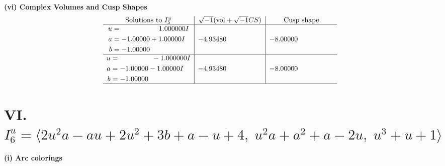 \documentclass[1p]{elsarticle_modified}
\theoremstyle{definition}
\newcommand{\I}{\sqrt{-1}}
\begin{document}
\newpage\flushleft \textbf{(vi) Complex Volumes and Cusp Shapes}
$$\begin{array}{c|c|c}  
\text{Solutions to }I^u_{5}& \I (\text{vol} + \sqrt{-1}CS) & \text{Cusp shape}\\
 \hline 
\begin{aligned}
u &= \phantom{-0.000000 -}1.000000 I \\
a &= -1.00000 + 1.00000 I \\
b &= -1.00000\phantom{ +0.000000I}\end{aligned}
 & -4.93480\phantom{ +0.000000I} & -8.00000\phantom{ +0.000000I} \\ \hline\begin{aligned}
u &= \phantom{-0.000000 } -1.000000 I \\
a &= -1.00000 - 1.00000 I \\
b &= -1.00000\phantom{ +0.000000I}\end{aligned}
 & -4.93480\phantom{ +0.000000I} & -8.00000\phantom{ +0.000000I}\\
 \hline 
 \end{array}$$\newpage\newpage\renewcommand{\arraystretch}{1}
\centering \section*{VI. $I^u_{6}= \langle 2 u^2 a- a u+2 u^2+3 b+a- u+4,\;u^2 a+a^2+a-2 u,\;u^3+u+1 \rangle$}
\flushleft \textbf{(i) Arc colorings}\\
\end{document}
